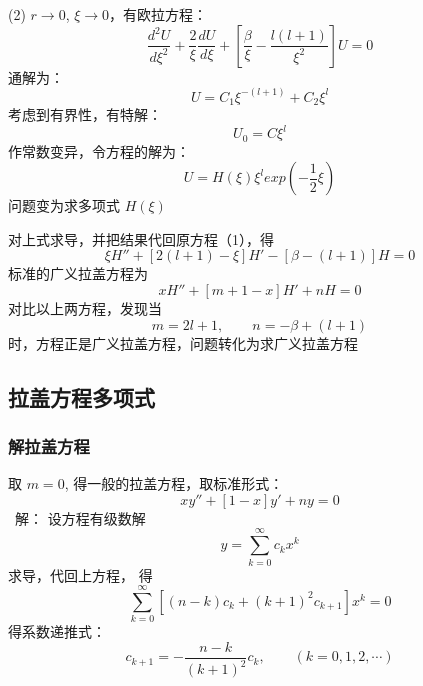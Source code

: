 \begin{frame}
	(2) $r\to 0$, $\xi \to 0$，有欧拉方程：
	\begin{equation*}
		\frac{d^2 U}{d \xi ^2} + \frac{2}{\xi }\frac{d U }{d \xi}  +[\frac{\beta}{\xi} - \frac{l(l+1)}{\xi ^2}] U=0
	\end{equation*}	 
	通解为：
	\begin{equation*}
		U=C_1 \xi ^{-(l+1)}+C_2 \xi ^ l 
	\end{equation*}	
	考虑到有界性，有特解：
	\begin{equation*}
		U_0=C  \xi ^ l 
	\end{equation*}	
	作常数变异，令方程的解为：
	\begin{equation*}
		U=H(\xi)  \xi ^ l  exp(-\frac{1}{2}\xi ) 
	\end{equation*}	
	问题变为求多项式 $H(\xi)$
\end{frame}	

\begin{frame}
	对上式求导，并把结果代回原方程（1），得
	\begin{equation*}
		\xi H''  + [2(l+1) -\xi] H' -[\beta -(l+1)] H =0
	\end{equation*}	
	标准的广义拉盖方程为
	\begin{equation*}
		x H''  + [m+1 -x] H' +n H =0
	\end{equation*}	
	对比以上两方程，发现当 
	\begin{equation*}
		m=2l+1, \qquad n=-\beta+(l+1)
	\end{equation*}	
	时，方程正是广义拉盖方程，问题转化为求广义拉盖方程
\end{frame}	

\subsection{拉盖方程多项式}

\begin{frame}
	\frametitle{解拉盖方程}
	取 $m=0$, 得一般的拉盖方程，取标准形式：
	\begin{equation*}
		x y''  + [1 -x] y' +n y =0
	\end{equation*}	
	\alert{ 解：} 设方程有级数解
	\begin{equation*}
		y=\sum_{k=0}^{\infty} c_k x^k
	\end{equation*}	
	求导，代回上方程， 得 
	\begin{equation*}
		\sum_{k=0}^{\infty} [(n-k)c_k +(k+1)^2 c_{k+1}  ] x^k =0
	\end{equation*}	
	得系数递推式：
	\begin{equation*}
		c_{k+1}=-\frac{n-k}{(k+1)^2} c_k, \qquad (k=0,1,2,\cdots)
	\end{equation*}	
\end{frame}	

